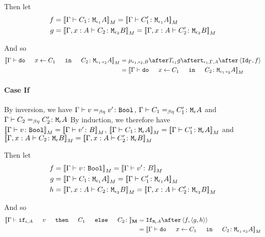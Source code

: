 {    Then let
    \begin{align}
        f &{}=\deno{\gtyperelation{C_1}{\M{\e_1}{A}}}= \deno{\gtyperelation{C_1'}{\M{\e_1}{A}}}\\
        g &{}=\deno{\typerelation{\gax}{C_2}{\M{\e_2}{B}}} = \deno{\typerelation{\gax}{C_2'}{\M{\e_2}{B}}}
    \end{align}



    And so
    \begin{equation}
        \begin{split}
            \deno{\gtyperelation{\doin{x}{C_1}{C_2}}{\M{\e_1\dot\e_2}{A}}} & = \bind{\e_1}{\e_2}{B} \after \T{\e_1}{g} \after \tstrength{\e_1}{\G}{A} \after \pr{\idg}{f}\\
             & = \deno{\gtyperelation{\doin{x}{C_1}{C_2}}{\M{\e_1\dot\e_2}{A}}}
        \end{split}
    \end{equation}
    \paragraph{Case If}
    By inversion, we have $\Gamma \vdash v =_{\beta\eta} v' \colon \texttt{Bool}$, $\Gamma \vdash C_1 =_{\beta\eta} C_1' \colon \texttt{M}_{\epsilon}{A}$ and $\Gamma \vdash C_2 =_{\beta\eta} C_2' \colon \texttt{M}_{\epsilon}{A}$
    By induction, we therefore have ${\bf [\![}\Gamma \vdash v \colon \texttt{Bool}{\bf ]\!]}_M = {\bf [\![}\Gamma \vdash v' \colon B{\bf ]\!]}_M$, ${\bf [\![}\Gamma \vdash C_1 \colon \texttt{M}_{\epsilon}{A}{\bf ]\!]}_M= {\bf [\![}\Gamma \vdash C_1' \colon \texttt{M}_{\epsilon}{A}{\bf ]\!]}_M$ and ${\bf [\![}\Gamma, x: A \vdash C_2 \colon \texttt{M}_{\epsilon}{B}{\bf ]\!]}_M = {\bf [\![}\Gamma, x: A \vdash C_2' \colon \texttt{M}_{\epsilon}{B}{\bf ]\!]}_M$

    Then let
    \begin{align}
        f &{}=\deno{\gtyperelation{v}{\B}} = \deno{\gtyperelation{v'}{B}}\\
        g &{}=\deno{\gtyperelation{C_1}{\M{\e_1}{A}}}= \deno{\gtyperelation{C_1'}{\M{\e_1}{A}}}\\
        h &{}=\deno{\typerelation{\gax}{C_2}{\M{\e_2}{B}}} = \deno{\typerelation{\gax}{C_2'}{\M{\e_2}{B}}}
    \end{align}



    And so
    \begin{equation}
        \begin{split}
            \deno{\gtyperelation{\ifthenelse{\e}{A}{v}{C_1}{C_2}}} & = \ifnt{\mea}\after \pr{f}{\pr{g}{h}}\\
             & = \deno{\gtyperelation{\doin{x}{C_1}{C_2}}{\M{\e_1\dot\e_2}{A}}}
        \end{split}
    \end{equation}
}
